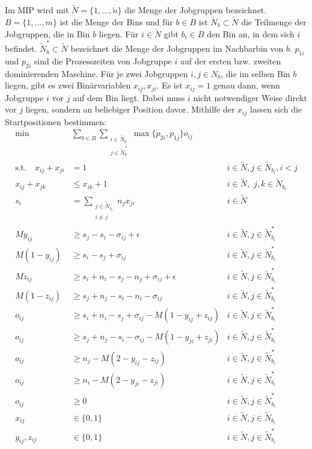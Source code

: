 \documentclass{scrreprt}
\begin{document}
Im MIP wird mit $\tilde{N}=\{1,\ldots,\tilde{n}\}$ die Menge der Jobgruppen bezeichnet.
$B=\{1,\ldots,m\}$ ist die Menge der Bins und für $b\in B$ ist $\tilde{N}_b\subset \tilde{N}$ die Teilmenge der Jobgruppen, die in Bin $b$ liegen.
Für $i\in\tilde{N}$ gibt $b_i\in B$ den Bin an, in dem sich $i$ befindet.
$\tilde{N}_b^*\subset \tilde{N}$ bezeichnet die Menge der Jobgruppen im Nachbarbin von $b$.
$p_{1i}$ und $p_{2i}$ sind die Prozesszeiten von Jobgruppe $i$ auf der ersten bzw. zweiten dominierenden Maschine.
Für je zwei Jobgruppen $i,j\in N_b$, die im selben Bin $b$ liegen, gibt es
zwei Binärvariablen $x_{ij},x_{ji}$. Es ist $x_{ij}=1$ genau dann, wenn 
Jobgruppe $i$ vor $j$ auf dem Bin liegt. Dabei muss $i$ nicht notwendiger
Weise direkt vor $j$ liegen, sondern an beliebiger Position davor.
Mithilfe der $x_{ij}$ lassen sich die Startpositionen bestimmen:
\begin{align}
    \text{min}\quad &\sum_{b\in B}\sum_{\substack{i\in \tilde{N_b}\\j\in \tilde{N}_b^*}} 
            \max\{p_{2i},p_{1j}\}o_{ij} \label{objfunc1}\\
			\text{s.t.} \quad x_{ij} + x_{ji} &= 1 &i\in \tilde{N}, j\in \tilde{N}_{b_i}, i<j \label{con1:reflex}\\
			x_{ij} + x_{jk} &\leq x_{ik} + 1 &i\in \tilde{N},\,\, j,k\in \tilde{N}_{b_i} \label{con1:transitiv} \\
			s_i &= \sum_{\substack{j\in \tilde{N}_{b_i}\\i\neq j}} n_j x_{ji} &i\in \tilde{N} \label{con1:start} \\
            My_{ij} &\geq s_j - s_i - \sigma_{ij} + \epsilon &i\in \tilde{N}, j\in \tilde{N}^*_{b_i} \label{con1:y1} \\
            M(1-y_{ij}) &\geq s_i - s_j + \sigma_{ij} &i\in \tilde{N}, j\in \tilde{N}^*_{b_i} \label{con1:y2} \\
            Mz_{ij} &\geq s_i + n_i - s_j - n_j + \sigma_{ij} + \epsilon &i\in \tilde{N}, j\in \tilde{N}^*_{b_i} \label{con1:z1} \\
            M(1-z_{ij}) &\geq s_j + n_j- s_i - n_i - \sigma_{ij} &i\in \tilde{N}, j\in \tilde{N}^*_{b_i} \label{con1:z2} \\
            o_{ij} &\geq s_i + n_i - s_j + \sigma_{ij} - M(1-y_{ij}+z_{ij}) &i\in \tilde{N}, j\in \tilde{N}^*_{b_i} \label{con1:o1} \\
            o_{ij} &\geq s_j + n_j - s_i - \sigma_{ij} - M(1-y_{ji}+z_{ji}) &i\in \tilde{N}, j\in \tilde{N}^*_{b_i} \label{con1:o2} \\
            o_{ij} &\geq n_j - M(2-y_{ij}-z_{ij}) &i\in \tilde{N}, j\in \tilde{N}^*_{b_i} \label{con1:o3} \\
            o_{ij} &\geq n_i - M(2-y_{ji}-z_{ji}) &i\in \tilde{N}, j\in \tilde{N}^*_{b_i} \label{con1:o4} \\
            o_{ij} &\geq 0 &i\in \tilde{N}, j\in \tilde{N}^*_{b_i} \label{con1:o5} \\
            x_{ij} &\in \{0,1\} &i\in \tilde{N}, j\in \tilde{N}_{b_i} \\
            y_{ij},z_{ij} &\in \{0,1\} &i\in \tilde{N}, j\in \tilde{N}^*_{b_i}
\end{align}
\end{document}
